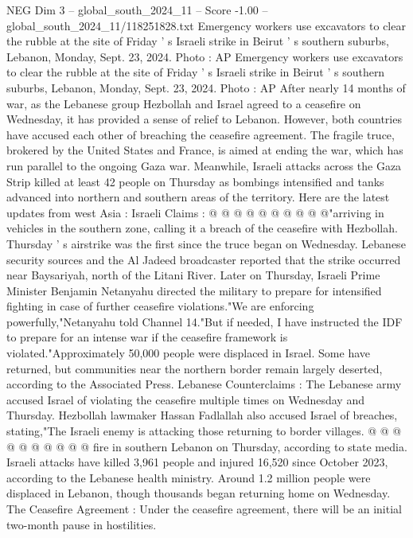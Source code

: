 \begin{textsample}{NEG Dim 3 – global\_south\_2024\_11 – Score -1.00 – global\_south\_2024\_11/118251828.txt}  \label{ex:f3_neg_156}
Emergency workers use excavators to clear the rubble at the site of Friday ' s Israeli strike in Beirut ' s southern suburbs, Lebanon, Monday, Sept. 23, 2024.
Photo : AP Emergency workers use excavators to clear the rubble at the site of Friday ' s Israeli strike in Beirut ' s southern suburbs, Lebanon, Monday, Sept. 23, 2024.
Photo : AP After nearly 14 months of war, as the Lebanese group Hezbollah and Israel agreed to a ceasefire on Wednesday, it has provided a sense of relief to Lebanon.
However, both countries have accused each other of breaching the ceasefire agreement.
The fragile truce, brokered by the United States and France, is aimed at ending the war, which has run parallel to the ongoing Gaza war.
Meanwhile, Israeli attacks across the Gaza Strip killed at least 42 people on Thursday as bombings intensified and tanks advanced into northern and southern areas of the territory.
Here are the latest updates from west Asia : Israeli Claims : @ @ @ @ @ @ @ @ @ @"arriving in vehicles in the southern zone, calling it a breach of the ceasefire with Hezbollah.
Thursday ' s airstrike was the first since the truce began on Wednesday.
Lebanese security sources and the Al Jadeed broadcaster reported that the strike occurred near Baysariyah, north of the Litani River.
Later on Thursday, Israeli Prime Minister Benjamin Netanyahu directed the military to prepare for intensified fighting in case of further ceasefire violations."We are enforcing powerfully,"Netanyahu told Channel 14."But if needed, I have instructed the IDF to prepare for an intense war if the ceasefire framework is violated."Approximately 50,000 people were displaced in Israel.
Some have returned, but communities near the northern border remain largely deserted, according to the Associated Press.
Lebanese Counterclaims : The Lebanese army accused Israel of violating the ceasefire multiple times on Wednesday and Thursday.
Hezbollah lawmaker Hassan Fadlallah also accused Israel of breaches, stating,"The Israeli enemy is attacking those returning to border villages. @ @ @ @ @ @ @ @ @ @ fire in southern Lebanon on Thursday, according to state media.
Israeli attacks have killed 3,961 people and injured 16,520 since October 2023, according to the Lebanese health ministry.
Around 1.2 million people were displaced in Lebanon, though thousands began returning home on Wednesday.
The Ceasefire Agreement : Under the ceasefire agreement, there will be an initial two-month pause in hostilities.

\end{textsample}
